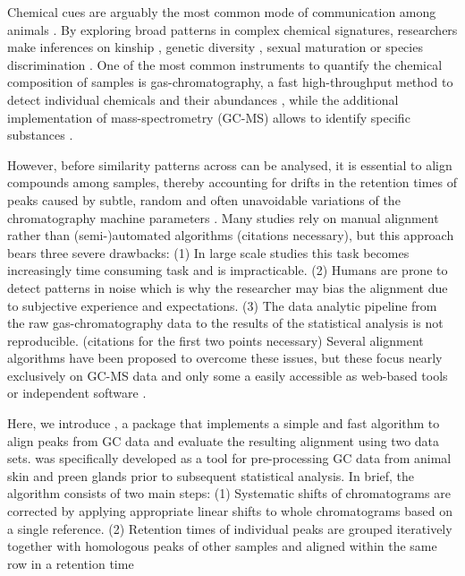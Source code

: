 Chemical cues are arguably the most common mode of communication among
animals \citep{Wyatt.2014}. By exploring broad patterns in complex
chemical signatures, researchers make inferences on kinship
\citep{Krause.2012, Stoffel.2015}, genetic diversity
\citep{Charpentier.2010, Leclaire.2012}, sexual maturation
\citep{Caspers.2011} or species discrimination
\citep{Meulemeester.2011}. One of the most common instruments to
quantify the chemical composition of samples is gas-chromatography, a
fast high-throughput method to detect individual chemicals and their
abundances \citep{McNair.2011}, while the additional implementation of
mass-spectrometry (GC-MS) allows to identify specific substances
\citep{Caspers.2011}. \par
However, before similarity patterns across can be analysed, it is
essential to align compounds among samples, thereby accounting for
drifts in the retention times of peaks caused by subtle, random and
often unavoidable variations of the chromatography machine parameters
\citep{Pierce.2005}. Many studies rely on manual alignment rather than
(semi-)automated algorithms (citations necessary), but this approach
bears three severe drawbacks: (1) In large scale studies this task
becomes increasingly time consuming task and is impracticable. (2)
Humans are prone to detect patterns in noise which is why the researcher
may bias the alignment due to subjective experience and expectations.
(3) The data analytic pipeline from the raw gas-chromatography data to
the results of the statistical analysis is not reproducible. (citations
for the first two points necessary) Several alignment algorithms have
been proposed to overcome these issues, but these focus nearly
exclusively on GC-MS data \citep{Pierce.2005, Robinson.2007,Jiang.2013}
and only some a easily accessible as web-based tools
\citep{Hoffmann.2009, Wang.2010} or independent software
\citep{Dellicour.2013}. \par
Here, we introduce , a package that implements a simple
and fast algorithm to align peaks from GC data and evaluate the
resulting alignment using two data sets.  was specifically
developed as a tool for pre-processing GC data from animal skin and
preen glands prior to subsequent statistical analysis. In brief, the
algorithm consists of two main steps: (1) Systematic shifts of
chromatograms are corrected by applying appropriate linear shifts to
whole chromatograms based on a single reference. (2) Retention times of
individual peaks are grouped iteratively together with homologous peaks
of other samples and aligned within the same row in a retention time
